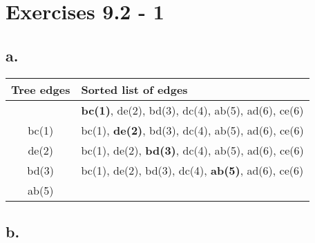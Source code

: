 \documentclass{article}
\begin{document}
\section{Exercises 9.2 - 1}

\subsection*{a.}

\begin{center}
  \begin{tabular}{c l}
    \hline
    Tree edges & Sorted list of edges \\
    \hline
               & \textbf{bc(1)}, de(2), bd(3), dc(4), ab(5), ad(6), ce(6) \\
    bc(1) & bc(1), \textbf{de(2)}, bd(3), dc(4), ab(5), ad(6), ce(6) \\
    de(2) & bc(1), de(2), \textbf{bd(3)}, dc(4), ab(5), ad(6), ce(6) \\
    bd(3) & bc(1), de(2), bd(3), dc(4), \textbf{ab(5)}, ad(6), ce(6) \\
    ab(5) & \\
    \hline
  \end{tabular}
\end{center}

\clearpage 

\subsection*{b.}
\end{document}
